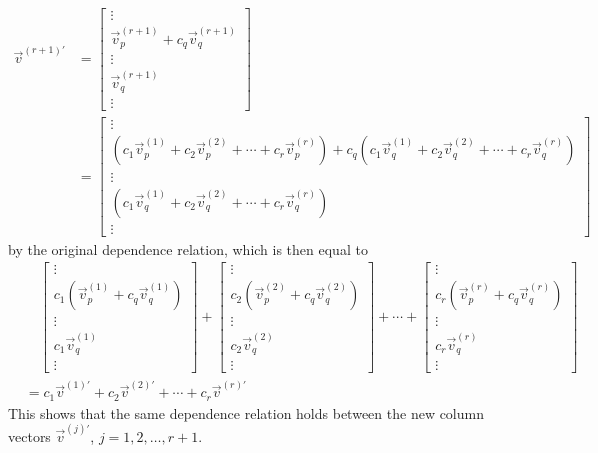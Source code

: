 \begin{align*}
\vec{v}^{(r+1)'} &= \begin{bmatrix}
\vdots \\
\vec{v}_p^{(r+1)} + c_q\vec{v}_q^{(r+1)} \\
\vdots \\
\vec{v}_q^{(r+1)} \\
\vdots
\end{bmatrix} \\
&=
\begin{bmatrix}
\vdots \\
(c_1\vec{v}_p^{(1)} + c_2\vec{v}_p^{(2)} + \cdots + c_r\vec{v}_p^{(r)}) + c_q(c_1\vec{v}_q^{(1)} + c_2\vec{v}_q^{(2)} + \cdots + c_r\vec{v}_q^{(r)}) \\
\vdots \\
(c_1\vec{v}_q^{(1)} + c_2\vec{v}_q^{(2)} + \cdots + c_r\vec{v}_q^{(r)}) \\
\vdots
\end{bmatrix}  
\end{align*}
by the original dependence relation, which is then equal to
\begin{align*}
&\quad \begin{bmatrix}
\vdots \\
c_1(\vec{v}_p^{(1)} + c_q\vec{v}_q^{(1)}) \\
\vdots \\
c_1\vec{v}_q^{(1)} \\
\vdots
\end{bmatrix}
+
\begin{bmatrix}
\vdots \\
c_2(\vec{v}_p^{(2)} + c_q\vec{v}_q^{(2)}) \\
\vdots \\
c_2\vec{v}_q^{(2)} \\
\vdots
\end{bmatrix} 
+ \cdots +
\begin{bmatrix}
\vdots \\
c_r(\vec{v}_p^{(r)} + c_q\vec{v}_q^{(r)}) \\
\vdots \\
c_r\vec{v}_q^{(r)} \\
\vdots
\end{bmatrix} \\
&= c_1\vec{v}^{(1)'} + c_2\vec{v}^{(2)'} + \cdots + c_r\vec{v}^{(r)'}
\end{align*}
This shows that the same dependence relation holds between the new column vectors $\vec{v}^{(j)'}$, $j = 1,2,\ldots,r+1$.

